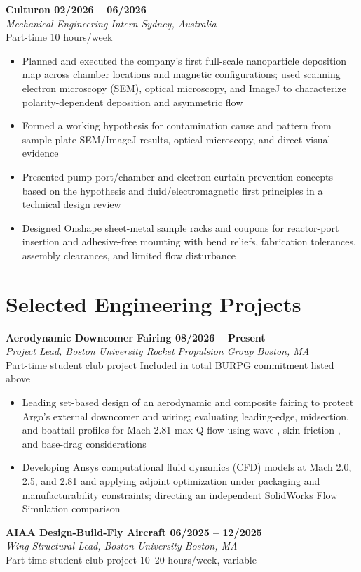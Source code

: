 \documentclass[letterpaper,11pt]{article}
\newcommand{\resumeEntry}[4]{
  {\small\textbf{#1 \textbar{} #2}}\\[-1pt]
  {\small\textit{#3}}\\[-1pt]
  {\small #4}
}
\newcommand{\resumeItem}[1]{\item \small{#1}}
\newcommand{\resumeItemListStart}{
  \begin{itemize}[
    leftmargin=0.17in,
    label=\textbullet,
    itemsep=1.5pt,
    topsep=2pt,
    parsep=0pt,
    partopsep=0pt
  ]
}
\newcommand{\resumeItemListEnd}{
  \end{itemize}\vspace{3pt}
}
\begin{document}
\resumeEntry
  {Culturon}
  {02/2026 -- 06/2026}
  {Mechanical Engineering Intern \textbar{} Sydney, Australia}
  {Part-time \textbar{} 10 hours/week}

\resumeItemListStart
  \resumeItem{
    Planned and executed the company's first full-scale nanoparticle
    deposition map across chamber locations and magnetic configurations;
    used scanning electron microscopy (SEM), optical microscopy, and
    ImageJ to characterize polarity-dependent deposition and asymmetric flow
  }
  \resumeItem{
    Formed a working hypothesis for contamination cause and pattern
    from sample-plate SEM/ImageJ results, optical microscopy, and direct
    visual evidence
  }
  \resumeItem{
    Presented pump-port/chamber and electron-curtain prevention concepts
    based on the hypothesis and fluid/electromagnetic first principles
    in a technical design review
  }
  \resumeItem{
    Designed Onshape sheet-metal sample racks and coupons for
    reactor-port insertion and adhesive-free mounting with bend reliefs,
    fabrication tolerances, assembly clearances, and limited flow disturbance
  }
\resumeItemListEnd

\newpage

\section{Selected Engineering Projects}

\resumeEntry
  {Aerodynamic Downcomer Fairing}
  {08/2026 -- Present}
  {Project Lead, Boston University Rocket Propulsion Group
   \textbar{} Boston, MA}
  {Part-time student club project
   \textbar{} Included in total BURPG commitment listed above}

\resumeItemListStart
  \resumeItem{
    Leading set-based design of an aerodynamic and composite fairing to protect
    Argo's external downcomer and wiring; evaluating leading-edge,
    midsection, and boattail profiles for Mach 2.81 max-Q flow using
    wave-, skin-friction-, and base-drag considerations
  }
  \resumeItem{
    Developing Ansys computational fluid dynamics (CFD) models at Mach
    2.0, 2.5, and 2.81 and applying adjoint optimization under packaging
    and manufacturability constraints; directing an independent
    SolidWorks Flow Simulation comparison
  }
\resumeItemListEnd

\resumeEntry
  {AIAA Design-Build-Fly Aircraft}
  {06/2025 -- 12/2025}
  {Wing Structural Lead, Boston University \textbar{} Boston, MA}
  {Part-time student club project
   \textbar{} 10--20 hours/week, variable}
\end{document}
